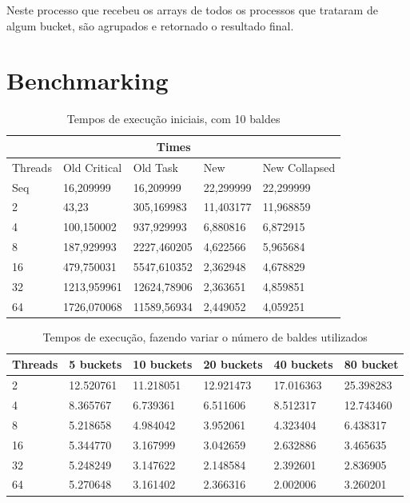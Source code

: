 \documentclass[a4paper]{report}
\begin{document}
Neste processo que recebeu os arrays de todos os processos que trataram de algum
bucket, são agrupados e retornado o resultado final.

\appendix

\chapter{Benchmarking}
\begin{table}[h]
    \centering
    \begin{tabular}{|l|l|l|l|l|}
        \hline
        \multicolumn{5}{|c|}{Times}                                      \\ \hline
        Threads & Old Critical & Old Task    & New       & New Collapsed \\ \hline
        Seq     & 16,209999    & 16,209999   & 22,299999 & 22,299999     \\ \hline
        2       & 43,23        & 305,169983  & 11,403177 & 11,968859     \\ \hline
        4       & 100,150002   & 937,929993  & 6,880816  & 6,872915      \\ \hline
        8       & 187,929993   & 2227,460205 & 4,622566  & 5,965684      \\ \hline
        16      & 479,750031   & 5547,610352 & 2,362948  & 4,678829      \\ \hline
        32      & 1213,959961  & 12624,78906 & 2,363651  & 4,859851      \\ \hline
        64      & 1726,070068  & 11589,56934 & 2,449052  & 4,059251      \\ \hline
    \end{tabular}
    \caption{\label{tab:Times}Tempos de execução iniciais, com 10 baldes}
\end{table}

\begin{table}[h]
    \centering
    \begin{tabular}{|l|l|l|l|l|l|}
        \hline
        Threads & 5 buckets & 10 buckets & 20 buckets & 40 buckets & 80 bucket \\ \hline
        2       & 12.520761 & 11.218051  & 12.921473  & 17.016363  & 25.398283 \\ \hline
        4       & 8.365767  & 6.739361   & 6.511606   & 8.512317   & 12.743460 \\ \hline
        8       & 5.218658  & 4.984042   & 3.952061   & 4.323404   & 6.438317  \\ \hline
        16      & 5.344770  & 3.167999   & 3.042659   & 2.632886   & 3.465635  \\ \hline
        32      & 5.248249  & 3.147622   & 2.148584   & 2.392601   & 2.836905  \\ \hline
        64      & 5.270648  & 3.161402   & 2.366316   & 2.002006   & 3.260201  \\ \hline
    \end{tabular}
    \caption{\label{tab:fix_size}Tempos de execução, fazendo variar o
    número de baldes utilizados}
\end{table}
\end{document}
